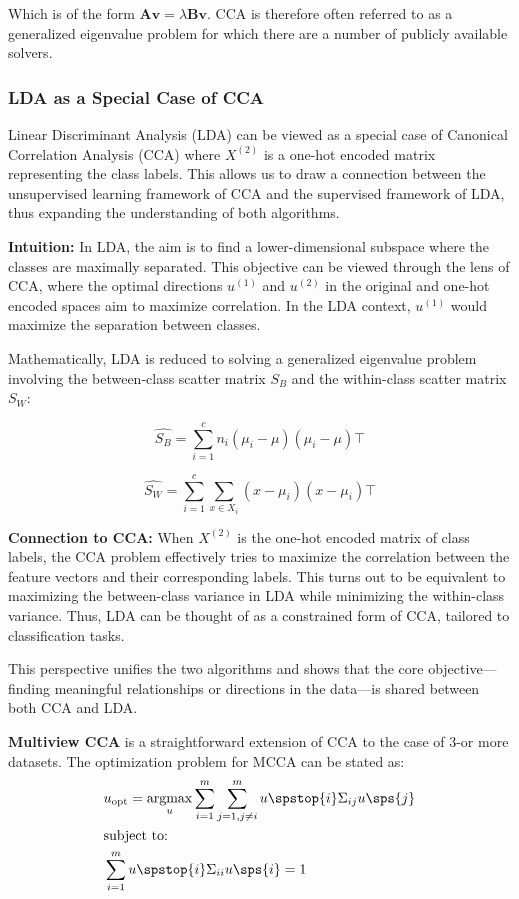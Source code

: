 Which is of the form $\mathbf{A v} = \lambda \mathbf{B v}$. CCA is therefore often referred to as a generalized eigenvalue problem for which there are a number of publicly available solvers.

\subsubsection{LDA as a Special Case of CCA}

Linear Discriminant Analysis (LDA) can be viewed as a special case of Canonical Correlation Analysis (CCA) where \(X^{(2)}\) is a one-hot encoded matrix representing the class labels.
This allows us to draw a connection between the unsupervised learning framework of CCA and the supervised framework of LDA, thus expanding the understanding of both algorithms.

\textbf{Intuition:} In LDA, the aim is to find a lower-dimensional subspace where the classes are maximally separated. This objective can be viewed through the lens of CCA, where the optimal directions \(u^{(1)}\) and \(u^{(2)}\) in the original and one-hot encoded spaces aim to maximize correlation. In the LDA context, \(u^{(1)}\) would maximize the separation between classes.

Mathematically, LDA is reduced to solving a generalized eigenvalue problem involving the between-class scatter matrix \(S_B\) and the within-class scatter matrix \(S_W\):

\[
    \hat{S_B} = \sum_{i=1}^{c} n_i (\mu_i - \mu)(\mu_i - \mu)\top
\]

\[
    \hat{S_W} = \sum_{i=1}^{c} \sum_{x \in X_i} (x - \mu_i)(x - \mu_i)\top
\]

\textbf{Connection to CCA:} When \(X^{(2)}\) is the one-hot encoded matrix of class labels, the CCA problem effectively tries to maximize the correlation between the feature vectors and their corresponding labels.
This turns out to be equivalent to maximizing the between-class variance in LDA while minimizing the within-class variance.
Thus, LDA can be thought of as a constrained form of CCA, tailored to classification tasks.

This perspective unifies the two algorithms and shows that the core objective—finding meaningful relationships or directions in the data—is shared between both CCA and LDA.

\textbf{Multiview CCA} is a straightforward extension of CCA to the case of 3-or more datasets.
The optimization problem for MCCA can be stated as:
\begin{align}
     & u_{\text{opt}} = \underset{u}{\mathrm{argmax}} \sum_{i=1}^{m} \sum_{j=1, j \neq i}^{m} u\spstop{i} \Sigma_{ij} u\sps{j} \\
     & \text{subject to:} \notag \\
     & \sum_{i=1}^{m} u\spstop{i} \Sigma_{ii} u\sps{i} = 1 \notag
\end{align}

